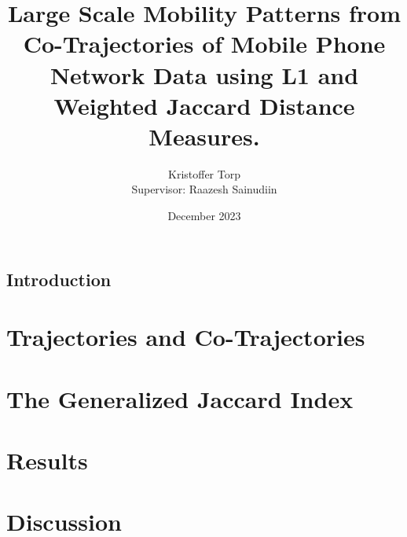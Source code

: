 \documentclass{report}
\title{Large Scale Mobility Patterns from Co-Trajectories of Mobile Phone Network Data using L1 and Weighted Jaccard Distance Measures.}
\author{Kristoffer Torp\\{\small Supervisor: Raazesh Sainudiin}}
\date{December 2023}
\begin{document}
\maketitle

    \begin{abstract}
        
    \end{abstract}

    \tableofcontents
    \newpage

    \section{Introduction}
        

    \chapter{Trajectories and Co-Trajectories}
        

    \chapter{The Generalized Jaccard Index}
        

    \chapter{Results}
        

    \chapter{Discussion}
        
    
    
    
\end{document}
